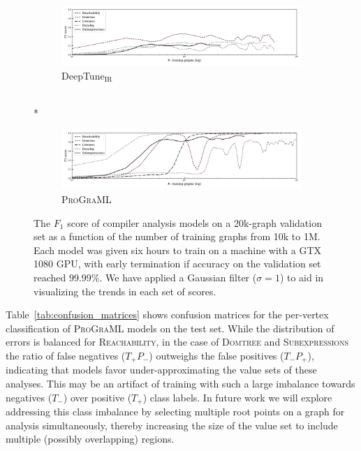 \begin{figure}
  \begin{subfigure}{\linewidth}
    \includegraphics[width=\linewidth]{images/dataflow-lstm.pdf}
    \caption{DeepTune$_{\text{IR}}$}
    \label{fig:dataflow-lstm-f1}
  \end{subfigure}
  \\*
  \begin{subfigure}{\linewidth}
    \includegraphics[width=\linewidth]{images/dataflow-ggnn.pdf}
    \caption{\textsc{ProGraML}}
    \label{fig:dataflow-ggnn-f1}
  \end{subfigure}
  \caption{%
    The $F_1$ score of compiler analysis models on a 20k-graph
    validation set as a function of the number of training graphs from
    10k to 1M. Each model was given six hours to train on a machine
    with a GTX 1080 GPU, with early termination if accuracy on the
    validation set reached 99.99\%. We have applied a Gaussian filter
    ($\sigma=1$) to aid in visualizing the trends in each set of
    scores.  }
  \label{fig:dataflow_convergence}
\end{figure}

Table~\ref{tab:confusion_matrices} shows confusion matrices for the
per-vertex classification of \textsc{ProGraML} models on the test
set. While the distribution of errors is balanced for
\textsc{Reachability}, in the case of \textsc{Domtree} and
\textsc{Subexpressions} the ratio of false negatives ($T_+P_-$)
outweighs the false positives ($T_-P_+$), indicating that models favor
under-approximating the value sets of these analyses. This may be an
artifact of training with such a large imbalance towards negatives
($T_-$) over positive ($T_+$) class labels. In future work we will
explore addressing this class imbalance by selecting multiple root
points on a graph for analysis simultaneously, thereby increasing the
size of the value set to include multiple (possibly overlapping)
regions.

